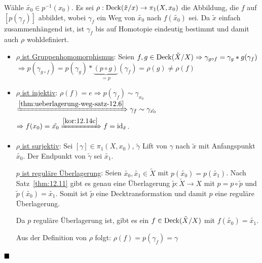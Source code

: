 \begin{beweis}
    Wähle $\tilde{x_0} \in p^{-1}(x_0)$. Es sei $\rho: \operatorname{Deck}(\tilde{x}/x) \rightarrow \pi_1(X, x_0)$
    die Abbildung, die $f$ auf $[p(\gamma_f)]$ abbildet, wobei $\gamma_f$
    ein Weg von $\tilde{x_0}$ nach $f(\tilde{x_0})$ sei. Da $\tilde{x}$
    einfach zusammenhängend ist, ist $\gamma_f$ bis auf Homotopie
    eindeutig bestimmt und damit auch $\rho$ wohldefiniert.

    \begin{itemize}
        \item \underline{$\rho$ ist Gruppenhomomorphismus}: Seien 
            $f, g \in \operatorname{Deck}(\tilde{X}/ X) \Rightarrow \gamma_{g \circ f} = \gamma_g * g(\gamma_f)$
            $\Rightarrow p(\gamma_{g \circ f}) = p(\gamma_g) * \underbrace{(p \circ g)}_{=p} (\gamma_f) = \rho(g) \neq \rho(f)$
        \item \underline{$\rho$ ist injektiv}: $\rho(f) = e \Rightarrow p (\gamma_f) \sim \gamma_{x_0}$
            $\xRightarrow{\ref{thm:ueberlagerung-weg-satz-12.6}} \gamma_f \sim \gamma_{\tilde{x_0}}$ 
            $\Rightarrow f(x_0) = \tilde{x_0} \xRightarrow{\ref{kor:12.14c}} f = \textnormal{id}_{\tilde{x}}$.
        \item \underline{$\rho$ ist surjektiv}: Sei $[\gamma] \in \pi_1(X, x_0)$,
            $\tilde{\gamma}$ Lift von $\gamma$ nach $\tilde{x}$ mit
            Anfangspunkt $\tilde{x_0}$. Der Endpunkt von $\tilde{\gamma}$
            sei $\tilde{x_1}$.

            \underline{$p$ ist reguläre Überlagerung}: Seien
            $\tilde{x_0}, \tilde{x_1} \in \tilde{X}$ mit 
            $p(\tilde{x_0}) = p(\tilde{x_1})$. Nach Satz~\ref{thm:12.11}
            gibt es genau eine Überlagerung $\tilde{p}: \tilde{X} \rightarrow X$
            mit $p=p \circ \tilde{p}$ und $\tilde{p}(\tilde{x_0}) = \tilde{x_1}$.
            Somit ist $\tilde{p}$ eine Decktransformation und damit
            $p$ eine reguläre Überlagerung.

            Da $p$ reguläre Überlagerung ist, gibt es ein $f \in \operatorname{Deck}(\tilde{X}/X)$
            mit $f(\tilde{x_0}) = \tilde{x_1}$.

            Aus der Definition von $\rho$ folgt: $\rho(f) = p (\gamma_f) = \gamma$
    \end{itemize}
            $\qed$
\end{beweis}

